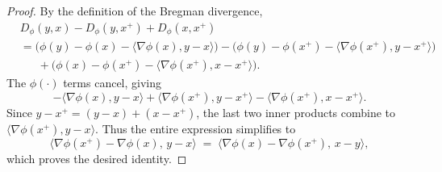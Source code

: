 \documentclass[10pt,a4paper]{amsart}
\begin{document}
\begin{proof}
By the definition of the Bregman divergence,
\begin{align*}
&D_\phi(y,x)-D_\phi(y,x^+)+D_\phi(x,x^+) \\
&= \big(\phi(y)-\phi(x)-\langle\nabla\phi(x),y-x\rangle\big)
   -\big(\phi(y)-\phi(x^+)-\langle\nabla\phi(x^+),y-x^+\rangle\big) \\
&\quad\;\;+\big(\phi(x)-\phi(x^+)-\langle\nabla\phi(x^+),x-x^+\rangle\big).
\end{align*}
The $\phi(\cdot)$ terms cancel, giving
\[
-\langle\nabla\phi(x),y-x\rangle
+\langle\nabla\phi(x^+),y-x^+\rangle
-\langle\nabla\phi(x^+),x-x^+\rangle.
\]
Since $y-x^+=(y-x)+(x-x^+)$, the last two inner products combine to
$\langle\nabla\phi(x^+),y-x\rangle$.
Thus the entire expression simplifies to
\[
\langle\nabla\phi(x^+)-\nabla\phi(x),\,y-x\rangle
\;=\;
\langle\nabla\phi(x)-\nabla\phi(x^+),\,x-y\rangle,
\]
which proves the desired identity.
\end{proof}
\end{document}
